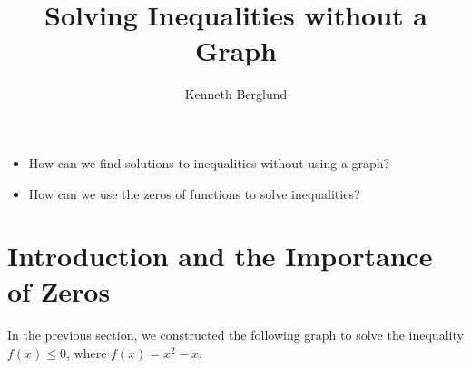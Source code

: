 \documentclass[noauthor, nooutcomes]{ximera}
\author{Kenneth Berglund}
\title{Solving Inequalities without a Graph}
\begin{document}
\begin{abstract}
  
\end{abstract}
\maketitle
\licenseSZ

\begin{motivatingQuestions}\begin{itemize}
	\item How can we find solutions to inequalities without using a graph?
	\item How can we use the zeros of functions to solve inequalities?
\end{itemize}\end{motivatingQuestions}

\section{Introduction and the Importance of Zeros}
In the previous section, we constructed the following graph to solve the inequality $f(x) \le 0$, where $f(x) = x^2 - x$.
\begin{image}
\end{image}
\end{document}
